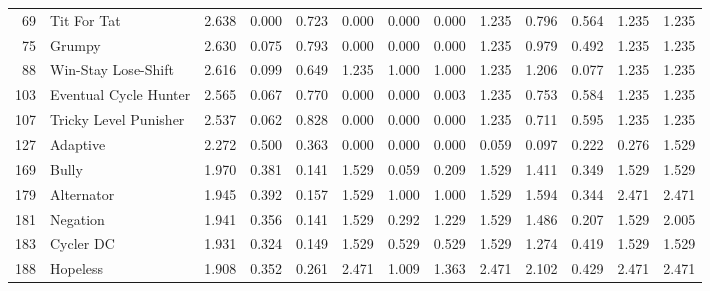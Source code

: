 \begin{tabular}{rlrrrrrrrrrrr}
   69 &            Tit For Tat &           2.638 &       0.000 &    0.723 &             0.000 &         0.000 &           0.000 &            1.235 &          0.796 &         0.564 &            1.235 &         1.235 \\
   75 &                 Grumpy &           2.630 &       0.075 &    0.793 &             0.000 &         0.000 &           0.000 &            1.235 &          0.979 &         0.492 &            1.235 &         1.235 \\
   88 &    Win-Stay Lose-Shift &           2.616 &       0.099 &    0.649 &             1.235 &         1.000 &           1.000 &            1.235 &          1.206 &         0.077 &            1.235 &         1.235 \\
  103 &  Eventual Cycle Hunter &           2.565 &       0.067 &    0.770 &             0.000 &         0.000 &           0.003 &            1.235 &          0.753 &         0.584 &            1.235 &         1.235 \\
  107 &  Tricky Level Punisher &           2.537 &       0.062 &    0.828 &             0.000 &         0.000 &           0.000 &            1.235 &          0.711 &         0.595 &            1.235 &         1.235 \\
  127 &               Adaptive &           2.272 &       0.500 &    0.363 &             0.000 &         0.000 &           0.000 &            0.059 &          0.097 &         0.222 &            0.276 &         1.529 \\
  169 &                  Bully &           1.970 &       0.381 &    0.141 &             1.529 &         0.059 &           0.209 &            1.529 &          1.411 &         0.349 &            1.529 &         1.529 \\
  179 &             Alternator &           1.945 &       0.392 &    0.157 &             1.529 &         1.000 &           1.000 &            1.529 &          1.594 &         0.344 &            2.471 &         2.471 \\
  181 &               Negation &           1.941 &       0.356 &    0.141 &             1.529 &         0.292 &           1.229 &            1.529 &          1.486 &         0.207 &            1.529 &         2.005 \\
  183 &              Cycler DC &           1.931 &       0.324 &    0.149 &             1.529 &         0.529 &           0.529 &            1.529 &          1.274 &         0.419 &            1.529 &         1.529 \\
  188 &               Hopeless &           1.908 &       0.352 &    0.261 &             2.471 &         1.009 &           1.363 &            2.471 &          2.102 &         0.429 &            2.471 &         2.471 \\

\end{tabular}
